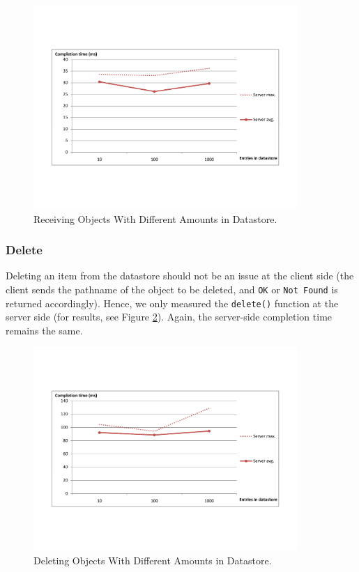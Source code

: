 \begin{figure} %
\begin{center}
\includegraphics[trim=5cm 4cm 5cm 5cm,width=10cm]{./figures/get_amt.pdf}
\caption{Receiving Objects With Different Amounts in Datastore.
\label{get-obj-amt}}
\end{center}
\end{figure}
 
\subsubsection{Delete}
Deleting an item from the datastore should not be an issue at the client side
(the client sends the pathname of the object to be deleted, and \texttt{OK} or
\texttt{Not Found} is returned accordingly). Hence, we only measured the
\texttt{delete()} function at the server side (for results, see Figure
\ref{del-obj-amt}). Again, the server-side completion time remains the same.
 
\begin{figure} %
\begin{center}
\includegraphics[trim=5cm 4cm 5cm 5cm,width=10cm]{./figures/del_amt.pdf}
\caption{Deleting Objects With Different Amounts in Datastore.
\label{del-obj-amt}}
\end{center}
\end{figure}
 
